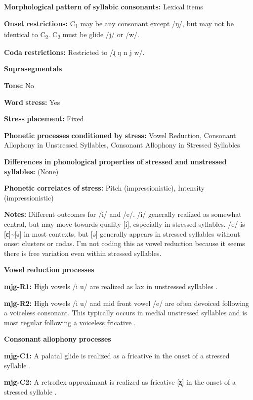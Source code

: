 \begin{styleBody}
\textbf{Morphological} \textbf{pattern} \textbf{of} \textbf{syllabic} \textbf{consonants:} Lexical items

\textbf{Onset} \textbf{restrictions:} C\textsubscript{1} may be any consonant except /ŋ/, but may not be identical to C\textsubscript{2}. C\textsubscript{2} must be glide /j/ or /w/. 

\textbf{Coda} \textbf{restrictions:} Restricted to /ɻ ŋ n j w/.

\textbf{Suprasegmentals}

\textbf{Tone:} No

\textbf{Word} \textbf{stress:} Yes

\textbf{Stress} \textbf{placement:} Fixed

\textbf{Phonetic} \textbf{processes} \textbf{conditioned} \textbf{by} \textbf{stress:} Vowel Reduction, Consonant Allophony in Unstressed Syllables, Consonant Allophony in Stressed Syllables

\textbf{Differences} \textbf{in} \textbf{phonological} \textbf{properties} \textbf{of} \textbf{stressed} \textbf{and} \textbf{unstressed} \textbf{syllables:} (None)

\textbf{Phonetic} \textbf{correlates} \textbf{of} \textbf{stress:} Pitch (impressionistic), Intensity (impressionistic)

\textbf{Notes:} Different outcomes for /i/ and /e/. /i/ generally realized as somewhat central, but may move towards quality [i], especially in stressed syllables. /e/ is [ɛ]{\textasciitilde}[ə] in most contexts, but [ə] generally appears in stressed syllables without onset clusters or codas. I’m not coding this as vowel reduction because it seems there is free variation even within stressed syllables.

\textbf{Vowel} \textbf{reduction} \textbf{processes}

\textbf{mjg-R1:} High vowels /i u/ are realized as lax in unstressed syllables \citep[35]{Slater2003}.

\textbf{mjg-R2:} High vowels /i u/ and mid front vowel /e/ are often devoiced following a voiceless consonant. This typically occurs in medial unstressed syllables and is most regular following a voiceless fricative \citep[36]{Slater2003}.

\textbf{Consonant} \textbf{allophony} \textbf{processes}

\textbf{mjg-C1:} A palatal glide is realized as a fricative in the onset of a stressed syllable \citep[31-2]{Slater2003}.

\textbf{mjg-C2:} A retroflex approximant is realized as fricative [ʐ] in the onset of a stressed syllable \citep[30]{Slater2003}.


\end{styleBody}
